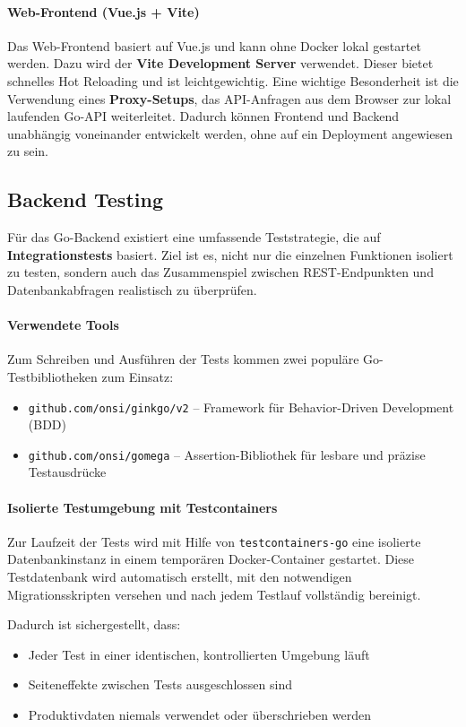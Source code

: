\documentclass[11pt,a4paper]{article}
\begin{document}
\paragraph{Web-Frontend (Vue.js + Vite)}
Das Web-Frontend basiert auf Vue.js und kann ohne Docker lokal gestartet werden. Dazu wird der \textbf{Vite Development Server}\cite{vite} verwendet. Dieser bietet schnelles Hot Reloading und ist leichtgewichtig. Eine wichtige Besonderheit ist die Verwendung eines \textbf{Proxy-Setups}, das API-Anfragen aus dem Browser zur lokal laufenden Go-API weiterleitet. Dadurch können Frontend und Backend unabhängig voneinander entwickelt werden, ohne auf ein Deployment angewiesen zu sein.

\subsection{Backend Testing}

Für das Go-Backend existiert eine umfassende Teststrategie, die auf \textbf{Integrationstests} basiert. Ziel ist es, nicht nur die einzelnen Funktionen isoliert zu testen, sondern auch das Zusammenspiel zwischen REST-Endpunkten und Datenbankabfragen realistisch zu überprüfen.

\paragraph{Verwendete Tools}
Zum Schreiben und Ausführen der Tests kommen zwei populäre Go-Testbibliotheken zum Einsatz:
\begin{itemize}
    \item \texttt{github.com/onsi/ginkgo/v2}\cite{ginkgo} – Framework für Behavior-Driven Development (BDD)
    \item \texttt{github.com/onsi/gomega}\cite{gomega} – Assertion-Bibliothek für lesbare und präzise Testausdrücke
\end{itemize}

\paragraph{Isolierte Testumgebung mit Testcontainers}
Zur Laufzeit der Tests wird mit Hilfe von \texttt{testcontainers-go}\cite{testcontainers} eine isolierte Datenbankinstanz in einem temporären Docker-Container gestartet. Diese Testdatenbank wird automatisch erstellt, mit den notwendigen Migrationsskripten versehen und nach jedem Testlauf vollständig bereinigt.

Dadurch ist sichergestellt, dass:
\begin{itemize}
    \item Jeder Test in einer identischen, kontrollierten Umgebung läuft
    \item Seiteneffekte zwischen Tests ausgeschlossen sind
    \item Produktivdaten niemals verwendet oder überschrieben werden
\end{itemize}
\end{document}
